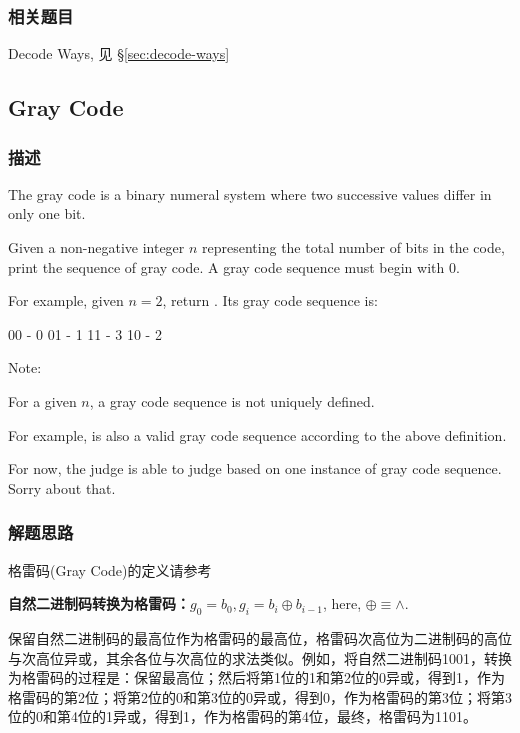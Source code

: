 \subsubsection{相关题目}
\begindot
\item Decode Ways, 见 \S \ref{sec:decode-ways}
\myenddot


\subsection{Gray Code} %
\label{sec:gray-code}


\subsubsection{描述}
The gray code is a binary numeral system where two successive values differ in 
only one bit.

Given a non-negative integer $n$ representing the total number of bits in the 
code, print the sequence of gray code. A gray code sequence must begin with 0.

For example, given $n = 2$, return \fn{[0,1,3,2]}. Its gray code sequence is:
\begin{Code}
	00 - 0
	01 - 1
	11 - 3
	10 - 2
\end{Code}

Note:
\begindot
\item For a given $n$, a gray code sequence is not uniquely defined.
\item For example, \fn{[0,2,3,1]} is also a valid gray code sequence according 
to the above definition.
\item For now, the judge is able to judge based on one instance of gray code 
sequence. Sorry about that.
\myenddot


\subsubsection{解题思路}
格雷码(Gray Code)的定义请参考 

\textbf{自然二进制码转换为格雷码：$g_0=b_0, g_i=b_i \oplus b_{i-1}$}, here, $\oplus\equiv \wedge$.

保留自然二进制码的最高位作为格雷码的最高位，格雷码次高位为二进制码的高位与次高位异或，其余各位与次高位的求法类似。例如，将自然二进制码1001，转换为格雷码的过程是：保留最高位；然后将第1位的1和第2位的0异或，得到1，作为格雷码的第2位；将第2位的0和第3位的0异或，得到0，作为格雷码的第3位；将第3位的0和第4位的1异或，得到1，作为格雷码的第4位，最终，格雷码为1101。

